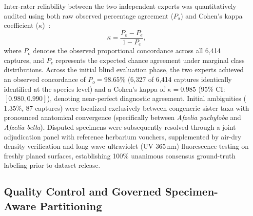 \documentclass[a4paper,fleqn,12pt]{cas-sc}
\begin{document}
Inter-rater reliability between the two independent experts was quantitatively audited using both raw observed percentage agreement ($P_o$) and Cohen's kappa coefficient ($\kappa$)~\cite{cohen1960}:
\begin{equation}
\kappa = \frac{P_o - P_e}{1 - P_e},
\end{equation}
where $P_o$ denotes the observed proportional concordance across all 6,414 captures, and $P_e$ represents the expected chance agreement under marginal class distributions. Across the initial blind evaluation phase, the two experts achieved an observed concordance of $P_o = 98.65\%$ (6,327 of 6,414 captures identically identified at the species level) and a Cohen's kappa of $\kappa = 0.985$ (95\% CI: $[0.980, 0.990]$), denoting near-perfect diagnostic agreement. Initial ambiguities ($1.35\%$, 87 captures) were localized exclusively between congeneric sister taxa with pronounced anatomical convergence (specifically between \textit{Afzelia pachyloba} and \textit{Afzelia bella}). Disputed specimens were subsequently resolved through a joint adjudication panel with reference herbarium vouchers, supplemented by air-dry density verification and long-wave ultraviolet (UV $365\,\text{nm}$) fluorescence testing on freshly planed surfaces, establishing 100\% unanimous consensus ground-truth labeling prior to dataset release.

\subsection{Quality Control and Governed Specimen-Aware Partitioning}
\end{document}
